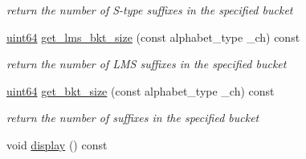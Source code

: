 \begin{DoxyCompactItemize}
\begin{DoxyCompactList}\small\item\em return the number of S-\/type suffixes in the specified bucket \end{DoxyCompactList}\item 
\hyperlink{types_8h_a60e8696a4678cd348e991a1f172e53f7}{uint64} \hyperlink{struct_validate4_1_1_bkt_info_a0f7a940f516eefaae031ecd75c0fc971}{get\+\_\+lms\+\_\+bkt\+\_\+size} (const alphabet\+\_\+type \+\_\+ch) const
\begin{DoxyCompactList}\small\item\em return the number of L\+MS suffixes in the specified bucket \end{DoxyCompactList}\item 
\hyperlink{types_8h_a60e8696a4678cd348e991a1f172e53f7}{uint64} \hyperlink{struct_validate4_1_1_bkt_info_a22256d03bfca21336fa30f2ed9e12d51}{get\+\_\+bkt\+\_\+size} (const alphabet\+\_\+type \+\_\+ch) const
\begin{DoxyCompactList}\small\item\em return the number of suffixes in the specified bucket \end{DoxyCompactList}\item 
void \hyperlink{struct_validate4_1_1_bkt_info_ad8bc43e62d48c2f33fc6173f2a1d0840}{display} () const
\end{DoxyCompactItemize}
